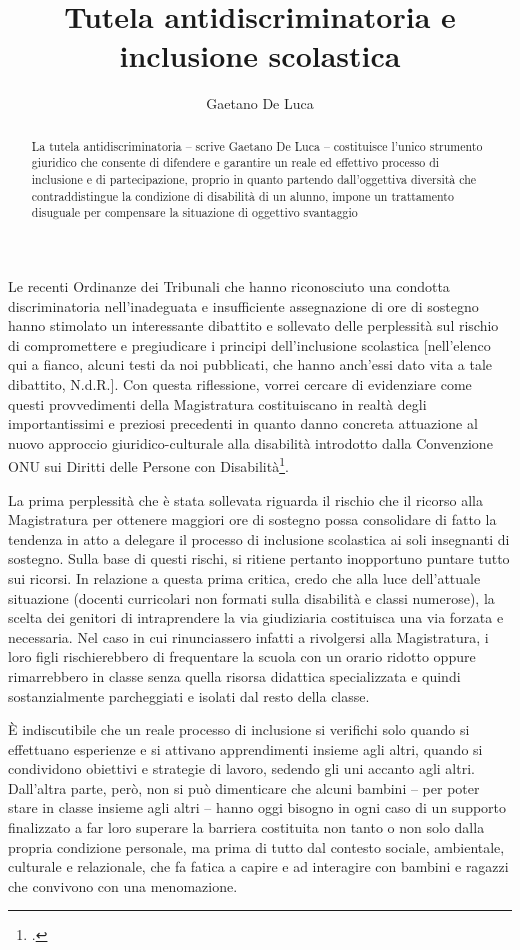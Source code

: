 \author{Gaetano De Luca}
\title{Tutela antidiscriminatoria e inclusione scolastica}
\label{cha:DeLuca140113}
\begin{abstract}
La tutela antidiscriminatoria – scrive Gaetano De Luca – costituisce l'unico strumento giuridico che consente di difendere e garantire un reale ed effettivo processo di inclusione e di partecipazione, proprio in quanto partendo dall'oggettiva diversità che contraddistingue la condizione di disabilità di un alunno, impone un trattamento disuguale per compensare la situazione di oggettivo svantaggio
\end{abstract}
\maketitle
{}
Le recenti Ordinanze dei Tribunali che hanno riconosciuto una condotta discriminatoria nell'inadeguata e insufficiente assegnazione di ore di sostegno hanno stimolato un interessante dibattito e sollevato delle perplessità sul rischio di compromettere e pregiudicare i principi dell'inclusione scolastica [nell'elenco qui a fianco, alcuni testi da noi pubblicati, che hanno anch'essi dato vita a tale dibattito, N.d.R.].
Con questa riflessione, vorrei cercare di evidenziare come questi provvedimenti della Magistratura costituiscano in realtà degli importantissimi e preziosi precedenti in quanto danno concreta attuazione al nuovo approccio giuridico-culturale alla disabilità introdotto dalla Convenzione ONU sui Diritti delle Persone con Disabilità\footcite{onu2006}.

La prima perplessità che è stata sollevata riguarda il rischio che il ricorso alla Magistratura per ottenere maggiori ore di sostegno possa consolidare di fatto la tendenza in atto a delegare il processo di inclusione scolastica ai soli insegnanti di sostegno. Sulla base di questi rischi, si ritiene pertanto inopportuno puntare tutto sui ricorsi.
In relazione a questa prima critica, credo che alla luce dell'attuale situazione (docenti curricolari non formati sulla disabilità e classi numerose), la scelta dei genitori di intraprendere la via giudiziaria costituisca una via forzata e necessaria. Nel caso in cui rinunciassero infatti a rivolgersi alla Magistratura, i loro figli rischierebbero di frequentare la scuola con un orario ridotto oppure rimarrebbero in classe senza quella risorsa didattica specializzata e quindi sostanzialmente parcheggiati e isolati dal resto della classe.

È indiscutibile che un reale processo di inclusione si verifichi solo quando si effettuano esperienze e si attivano apprendimenti insieme agli altri, quando si condividono obiettivi e strategie di lavoro, sedendo gli uni accanto agli altri. Dall'altra parte, però, non si può dimenticare che alcuni bambini – per poter stare in classe insieme agli altri – hanno oggi bisogno in ogni caso di un supporto finalizzato a far loro superare la barriera costituita non tanto o non solo dalla propria condizione personale, ma prima di tutto dal contesto sociale, ambientale, culturale e relazionale, che fa fatica a capire e ad interagire con bambini e ragazzi che convivono con una menomazione.


